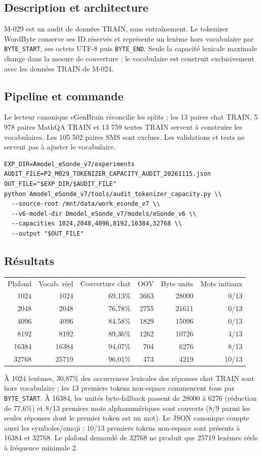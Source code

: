 \documentclass[11pt,a4paper]{report}
\begin{document}
\subsection{Description et architecture}
M-029 est un audit de données TRAIN, sans entraînement. Le tokenizer WordByte conserve ses ID réservés et représente un lexème hors vocabulaire par \texttt{BYTE\_START}, ses octets UTF-8 puis \texttt{BYTE\_END}. Seule la capacité lexicale maximale change dans la mesure de couverture ; le vocabulaire est construit exclusivement avec les données TRAIN de M-024.
\subsection{Pipeline et commande}
Le lecteur canonique eGenBrain réconcilie les splits ; les 13 paires chat TRAIN, 5 978 paires MathQA TRAIN et 13 759 textes TRAIN servent à construire les vocabulaires. Les 105 502 paires SMS sont exclues. Les validations et tests ne servent pas à ajuster le vocabulaire.
\begin{verbatim}
EXP_DIR=Amodel_eSonde_v7/experiments
AUDIT_FILE=P2_M029_TOKENIZER_CAPACITY_AUDIT_20261115.json
OUT_FILE="$EXP_DIR/$AUDIT_FILE"
python Amodel_eSonde_v7/tools/audit_tokenizer_capacity.py \\
  --source-root /mnt/data/work_esonde_v7 \\
  --v6-model-dir Dmodel_eSonde_v7/models/eSonde_v6 \\
  --capacities 1024,2048,4096,8192,16384,32768 \\
  --output "$OUT_FILE"
\end{verbatim}
\subsection{Résultats}
\begin{center}
\begin{tabular}{r r r r r r}
Plafond & Vocab. réel & Couverture chat & OOV & Byte units & Mots initiaux\\
1024 & 1024 & 69,13\% & 3663 & 28000 & 0/13\\
2048 & 2048 & 76,78\% & 2755 & 21611 & 0/13\\
4096 & 4096 & 84,58\% & 1829 & 15096 & 0/13\\
8192 & 8192 & 89,36\% & 1262 & 10726 & 4/13\\
16384 & 16384 & 94,07\% & 704 & 6276 & 8/13\\
32768 & 25719 & 96,01\% & 473 & 4219 & 10/13
\end{tabular}
\end{center}
À 1024 lexèmes, 30,87\% des occurrences lexicales des réponses chat TRAIN sont hors vocabulaire ; les 13 premiers tokens non-espace commencent tous par \texttt{BYTE\_START}. À 16384, les unités byte-fallback passent de 28000 à 6276 (réduction de 77,6\%) et 8/13 premiers mots alphanumériques sont couverts (8/9 parmi les seules réponses dont le premier token est un mot). Le JSON canonique compte aussi les symboles/emoji : 10/13 premiers tokens non-espace sont présents à 16384 et 32768. Le plafond demandé de 32768 ne produit que 25719 lexèmes réels à fréquence minimale 2.
\end{document}

